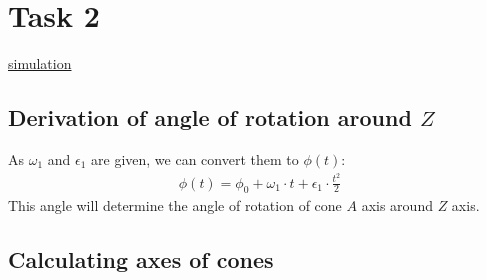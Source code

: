 \section{Task 2}

\href{https://lvjonok.github.io/f22-theoretical-mechanics/homework2/task2/dist/client/index.html}{simulation}

\subsection{Derivation of angle of rotation around $Z$}

As $\omega_1$ and $\epsilon_1$ are given, we can convert them to $\phi(t)$:
\begin{align}
    \phi(t) = \phi_0 + \omega_1 \cdot t + \epsilon_1 \cdot \frac{t^2}{2}
\end{align}
This angle will determine the angle of rotation of cone $A$ axis around $Z$ axis.

\subsection{Calculating axes of cones}

